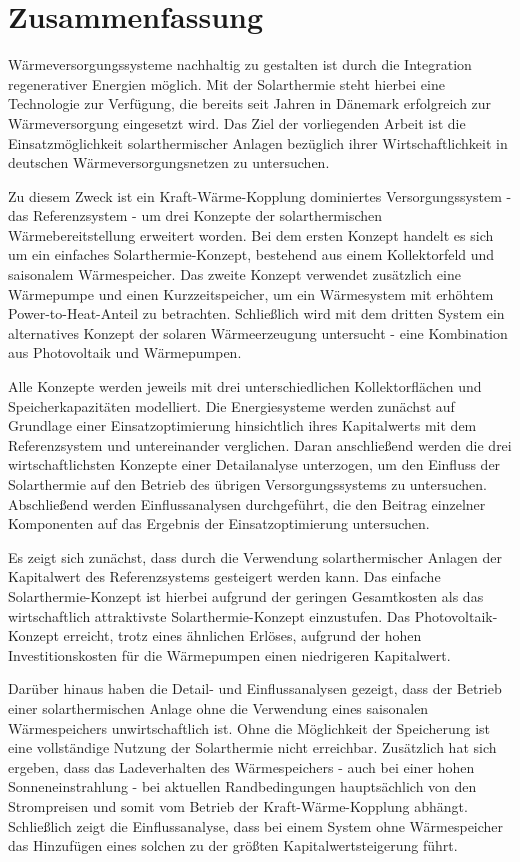 \chapter*{Zusammenfassung}
Wärmeversorgungssysteme nachhaltig zu gestalten ist durch die Integration regenerativer Energien möglich. Mit der Solarthermie steht hierbei eine Technologie zur Verfügung, die bereits seit Jahren in Dänemark erfolgreich zur Wärmeversorgung eingesetzt wird. Das Ziel der vorliegenden Arbeit ist die Einsatzmöglichkeit solarthermischer Anlagen bezüglich ihrer Wirtschaftlichkeit in deutschen Wärmeversorgungsnetzen zu untersuchen.

Zu diesem Zweck ist ein Kraft-Wärme-Kopplung dominiertes Versorgungssystem - das Referenzsystem - um drei Konzepte der solarthermischen Wärmebereitstellung erweitert worden. Bei dem ersten Konzept handelt es sich um ein einfaches Solarthermie-Konzept, bestehend aus einem Kollektorfeld und saisonalem Wärmespeicher. Das zweite Konzept verwendet zusätzlich eine Wärmepumpe und einen Kurzzeitspeicher, um ein Wärmesystem mit erhöhtem Power-to-Heat-Anteil zu betrachten. Schließlich wird mit dem dritten System ein alternatives Konzept der solaren Wärmeerzeugung untersucht - eine Kombination aus Photovoltaik und Wärmepumpen. 

Alle Konzepte werden jeweils mit drei unterschiedlichen Kollektorflächen und Speicherkapazitäten modelliert. Die Energiesysteme werden zunächst auf Grundlage einer Einsatzoptimierung hinsichtlich ihres Kapitalwerts mit dem Referenzsystem und untereinander verglichen. Daran anschließend werden die drei wirtschaftlichsten Konzepte einer Detailanalyse unterzogen, um den Einfluss der Solarthermie auf den Betrieb des übrigen Versorgungssystems zu untersuchen. Abschließend werden Einflussanalysen durchgeführt, die den Beitrag einzelner Komponenten auf das Ergebnis der Einsatzoptimierung untersuchen.

Es zeigt sich zunächst, dass durch die Verwendung solarthermischer Anlagen der Kapitalwert des Referenzsystems gesteigert werden kann. Das einfache Solarthermie-Konzept ist hierbei aufgrund der geringen Gesamtkosten als das wirtschaftlich attraktivste Solarthermie-Konzept einzustufen. Das Photovoltaik-Konzept erreicht, trotz eines ähnlichen Erlöses, aufgrund der hohen Investitionskosten für die Wärmepumpen einen niedrigeren Kapitalwert. 

Darüber hinaus haben die Detail- und Einflussanalysen gezeigt, dass der Betrieb einer solarthermischen Anlage ohne die Verwendung eines saisonalen Wärmespeichers unwirtschaftlich ist. Ohne die Möglichkeit der Speicherung ist eine vollständige Nutzung der Solarthermie nicht erreichbar. Zusätzlich hat sich ergeben, dass das Ladeverhalten des Wärmespeichers - auch bei einer hohen Sonneneinstrahlung - bei aktuellen Randbedingungen hauptsächlich von den Strompreisen und somit vom Betrieb der Kraft-Wärme-Kopplung abhängt. Schließlich zeigt die Einflussanalyse, dass bei einem System ohne Wärmespeicher das Hinzufügen eines solchen zu der größten Kapitalwertsteigerung führt.
